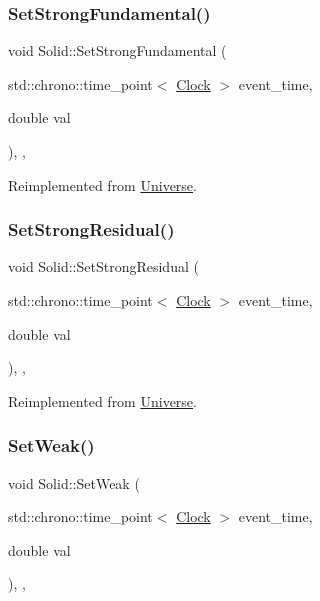 \subsubsection{\texorpdfstring{Set\+Strong\+Fundamental()}{SetStrongFundamental()}}
{\footnotesize\ttfamily void Solid\+::\+Set\+Strong\+Fundamental (\begin{DoxyParamCaption}\item[{std\+::chrono\+::time\+\_\+point$<$ \mbox{\hyperlink{universe_8h_a0ef8d951d1ca5ab3cfaf7ab4c7a6fd80}{Clock}} $>$}]{event\+\_\+time,  }\item[{double}]{val }\end{DoxyParamCaption})\hspace{0.3cm}{\ttfamily [inline]}, {\ttfamily [final]}, {\ttfamily [virtual]}}



Reimplemented from \mbox{\hyperlink{classUniverse_aafec97a231126b71c73ac1258609a284}{Universe}}.

\mbox{\label{classSolid_a8b80ebe209fcd3afa4791968127753d0}} 
\subsubsection{\texorpdfstring{Set\+Strong\+Residual()}{SetStrongResidual()}}
{\footnotesize\ttfamily void Solid\+::\+Set\+Strong\+Residual (\begin{DoxyParamCaption}\item[{std\+::chrono\+::time\+\_\+point$<$ \mbox{\hyperlink{universe_8h_a0ef8d951d1ca5ab3cfaf7ab4c7a6fd80}{Clock}} $>$}]{event\+\_\+time,  }\item[{double}]{val }\end{DoxyParamCaption})\hspace{0.3cm}{\ttfamily [inline]}, {\ttfamily [final]}, {\ttfamily [virtual]}}



Reimplemented from \mbox{\hyperlink{classUniverse_a1b2d6197ddf3d613cc30bd04d22ed8b7}{Universe}}.

\mbox{\label{classSolid_aa28e0f7e4de2fc0c1e28d385214296bf}} 
\subsubsection{\texorpdfstring{Set\+Weak()}{SetWeak()}}
{\footnotesize\ttfamily void Solid\+::\+Set\+Weak (\begin{DoxyParamCaption}\item[{std\+::chrono\+::time\+\_\+point$<$ \mbox{\hyperlink{universe_8h_a0ef8d951d1ca5ab3cfaf7ab4c7a6fd80}{Clock}} $>$}]{event\+\_\+time,  }\item[{double}]{val }\end{DoxyParamCaption})\hspace{0.3cm}{\ttfamily [inline]}, {\ttfamily [final]}, {\ttfamily [virtual]}}



